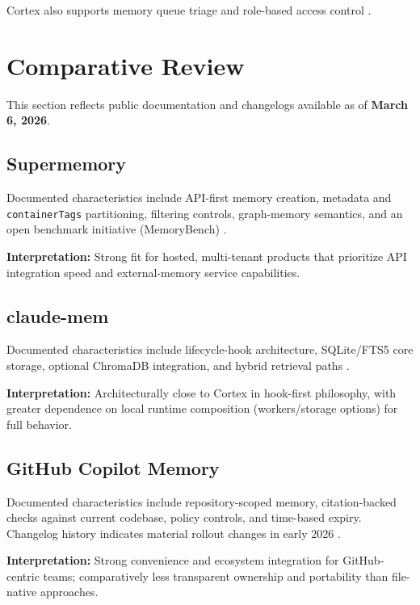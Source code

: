 \documentclass[11pt]{article}
\begin{document}
Cortex also supports memory queue triage and role-based access control \cite{cortex-shared,cortex-index}.

\section{Comparative Review}
This section reflects public documentation and changelogs available as of \textbf{March 6, 2026}.

\subsection{Supermemory}
Documented characteristics include API-first memory creation, metadata and \texttt{containerTags} partitioning, filtering controls, graph-memory semantics, and an open benchmark initiative (MemoryBench) \cite{sm-intro,sm-create,sm-filter,sm-graph,sm-bench}.

\textbf{Interpretation:}
Strong fit for hosted, multi-tenant products that prioritize API integration speed and external-memory service capabilities.

\subsection{claude-mem}
Documented characteristics include lifecycle-hook architecture, SQLite/FTS5 core storage, optional ChromaDB integration, and hybrid retrieval paths \cite{cm-overview,cm-hooks,cm-db,cm-search}.

\textbf{Interpretation:}
Architecturally close to Cortex in hook-first philosophy, with greater dependence on local runtime composition (workers/storage options) for full behavior.

\subsection{GitHub Copilot Memory}
Documented characteristics include repository-scoped memory, citation-backed checks against current codebase, policy controls, and time-based expiry. Changelog history indicates material rollout changes in early 2026 \cite{gh-memory-docs,gh-changelog-mar2026,gh-changelog-jan2026}.

\textbf{Interpretation:}
Strong convenience and ecosystem integration for GitHub-centric teams; comparatively less transparent ownership and portability than file-native approaches.
\end{document}
